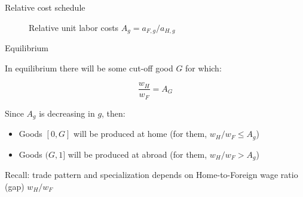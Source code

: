 \documentclass[notes,11pt, aspectratio=169, xcolor=table]{beamer}
\newenvironment{wideitemize}{\itemize\addtolength{\itemsep}{10pt}}{\enditemize}
\begin{document}
\begin{frame}{Relative cost schedule}
    \begin{figure}
        \centering
        \caption{Relative unit labor costs $A_g = a_{F,g} / a_{H,g}$}
        \label{fig:Ap}
    \end{figure}
\end{frame}


\begin{frame}{Equilibrium}
\begin{wideitemize}
    \item<1-> In equilibrium there will be some cut-off good $G$ for which:

    \begin{equation*}
        \frac{w_H}{w_F} = A_G
    \end{equation*}

     \item<2-> Since $A_g$ is decreasing in $g$, then:

     \begin{itemize}
         \item Goods $[0,G]$ will be produced at home (for them, $w_H / w_F \le A_g$)
         \item Goods $(G,1]$ will be produced at abroad (for them, $w_H / w_F > A_g$)
        \end{itemize}

        \item<3-> Recall: trade pattern and specialization depends on Home-to-Foreign wage ratio (gap) $w_H/w_F$ 

    \end{wideitemize}
\end{frame}
\end{document}
